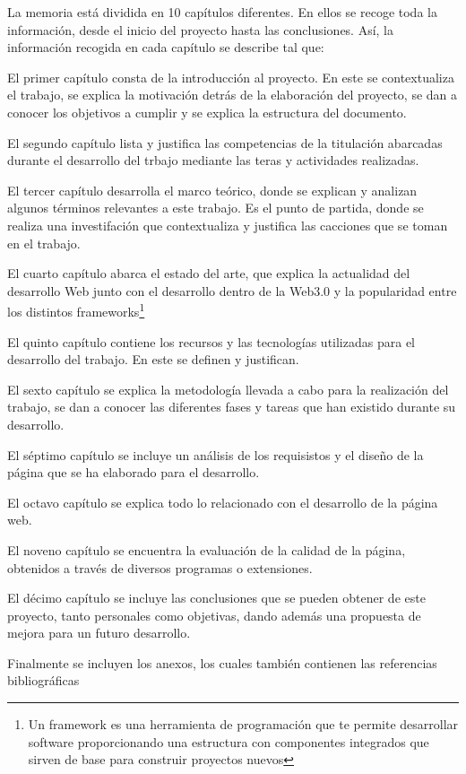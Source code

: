 La memoria está dividida en 10 capítulos diferentes. En ellos se recoge toda
la información, desde el inicio del proyecto hasta las conclusiones. Así, 
la información recogida en cada capítulo se describe tal que:

\-\hspace{1cm} El primer capítulo consta de la introducción al proyecto. En este se 
contextualiza el trabajo, se explica la motivación detrás de la elaboración 
del proyecto, se dan a conocer los objetivos a cumplir y se explica la 
estructura del documento.

\-\hspace{1cm} El segundo capítulo lista y justifica las competencias de la titulación
abarcadas durante el desarrollo del trbajo mediante las teras y actividades realizadas.

\-\hspace{1cm} El tercer capítulo desarrolla el marco teórico, donde se explican y 
analizan algunos términos relevantes a este trabajo. Es el punto de partida, 
donde se realiza una investifación que contextualiza y justifica las cacciones
que se toman en el trabajo.

\-\hspace{1cm} El cuarto capítulo abarca el estado del arte, que explica la 
actualidad del desarrollo Web junto con el desarrollo dentro de la Web3.0 y 
la popularidad entre los distintos frameworks\footnote{Un framework es una 
herramienta de programación que te permite desarrollar software proporcionando 
una estructura con componentes integrados que sirven de base para construir 
proyectos nuevos\cite{bootcampFramework}}

\-\hspace{1cm} El quinto capítulo contiene los recursos y las tecnologías 
utilizadas para el desarrollo del trabajo. En este se definen y justifican.

\-\hspace{1cm} El sexto capítulo se explica la metodología llevada a cabo 
para la realización del trabajo, se dan a conocer las diferentes fases y 
tareas que han existido durante su desarrollo.

\-\hspace{1cm} El séptimo capítulo se incluye un análisis de los requisistos y 
el diseño de la página que se ha elaborado para el desarrollo.

\-\hspace{1cm} El octavo capítulo se explica todo lo relacionado con el 
desarrollo de la página web.

\-\hspace{1cm} El noveno capítulo se encuentra la evaluación de la calidad de la página, 
obtenidos a través de diversos programas o extensiones.

\-\hspace{1cm} El décimo capítulo se incluye las conclusiones que se pueden obtener 
de este proyecto, tanto personales como objetivas, dando además una propuesta de mejora 
para un futuro desarrollo.

\-\hspace{1cm} Finalmente se incluyen los anexos, los cuales también contienen las 
referencias bibliográficas